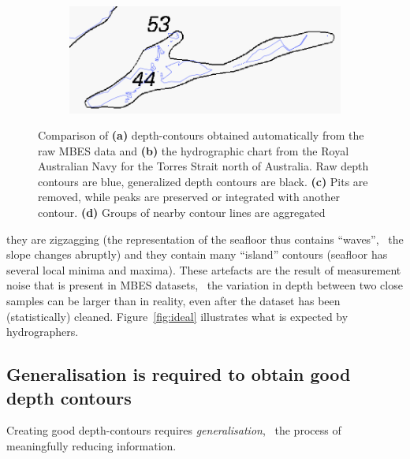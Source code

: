 \begin{figure}
\begin{subfigure}[b]{0.45\linewidth}
    \caption{}
  \end{subfigure}
  \begin{subfigure}[b]{0.45\linewidth}
    \centering
    \includegraphics[width=\textwidth]{figs/aggregation.png}
    \caption{}\label{fig:aggregation}
  \end{subfigure}
\caption{Comparison of \textbf{(a)} depth-contours obtained automatically from the raw MBES data and \textbf{(b)} the hydrographic chart from the Royal Australian Navy for the Torres Strait north of Australia. Raw depth contours are blue, generalized depth contours are black. \textbf{(c)} Pits are removed, while peaks are preserved or integrated with another contour. \textbf{(d)} Groups of nearby contour lines are aggregated}
\label{fig:contouringaspects}
\end{figure}
they are zigzagging (the representation of the seafloor thus contains ``waves'', \ie\ the slope changes abruptly) and they contain many ``island'' contours (seafloor has several local minima and maxima). 
These artefacts are the result of measurement noise that is present in MBES datasets, \ie\ the variation in depth between two close samples can be larger than in reality, even after the dataset has been (statistically) cleaned.
Figure~\ref{fig:ideal} illustrates what is expected by hydrographers.


%
\subsection{Generalisation is required to obtain good depth contours}
\label{sec:good-depth-contours}

Creating good depth-contours requires \emph{generalisation}, \ie\ the process of meaningfully reducing information.

%

